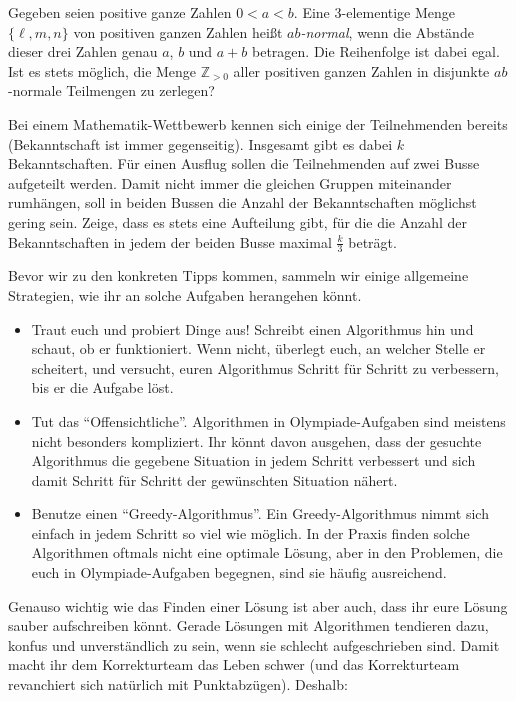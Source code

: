 \begin{aufgabe*}[*]\label{aufgabe:531046}
	Gegeben seien positive ganze Zahlen $0<a<b$. Eine $3$-elementige Menge $\{\ell,m,n\}$ von positiven ganzen Zahlen heißt \emph{$ab$-normal}, wenn die  Abstände dieser drei Zahlen genau $a$, $b$ und $a+b$ betragen. Die Reihenfolge ist dabei egal. Ist es stets möglich, die Menge $\mathbb Z_{>0}$ aller positiven ganzen Zahlen in disjunkte $ab$-normale Teilmengen zu zerlegen?
\end{aufgabe*}
\begin{aufgabe*}[*]\label{aufgabe:541143}
	Bei einem Mathematik-Wettbewerb kennen sich einige der Teilnehmenden bereits (Bekanntschaft ist immer gegenseitig). Insgesamt gibt es dabei $k$ Bekanntschaften. Für einen Ausflug sollen die Teilnehmenden auf zwei Busse aufgeteilt werden. Damit nicht immer die gleichen Gruppen miteinander rumhängen, soll in beiden Bussen die Anzahl der Bekanntschaften möglichst gering sein. Zeige, dass es stets eine Aufteilung gibt, für die die Anzahl der Bekanntschaften in jedem der beiden Busse maximal $\frac{k}{3}$ beträgt.
\end{aufgabe*}
Bevor wir zu den konkreten Tipps kommen, sammeln wir einige allgemeine Strategien, wie ihr an solche Aufgaben herangehen könnt.
\begin{itemize}
	\item Traut euch und probiert Dinge aus! Schreibt einen Algorithmus hin und schaut, ob er funktioniert. Wenn nicht, überlegt euch, an welcher Stelle er scheitert, und versucht, euren Algorithmus Schritt für Schritt zu verbessern, bis er die Aufgabe löst.
	\item Tut das \enquote{Offensichtliche}. Algorithmen in Olympiade-Aufgaben sind meistens nicht besonders kompliziert. Ihr könnt davon ausgehen, dass der gesuchte Algorithmus die gegebene Situation in jedem Schritt verbessert und sich damit Schritt für Schritt der gewünschten Situation nähert.
	\item Benutze einen \enquote{Greedy-Algorithmus}. Ein Greedy-Algorithmus nimmt sich einfach in jedem Schritt so viel wie möglich. In der Praxis finden solche Algorithmen oftmals nicht eine optimale Lösung, aber in den Problemen, die euch in Olympiade-Aufgaben begegnen, sind sie häufig ausreichend.
\end{itemize}
Genauso wichtig wie das Finden einer Lösung ist aber auch, dass ihr eure Lösung sauber aufschreiben könnt. Gerade Lösungen mit Algorithmen tendieren dazu, konfus und unverständlich zu sein, wenn sie schlecht aufgeschrieben sind. Damit macht ihr dem Korrekturteam das Leben schwer (und das Korrekturteam revanchiert sich natürlich mit Punktabzügen). Deshalb:
